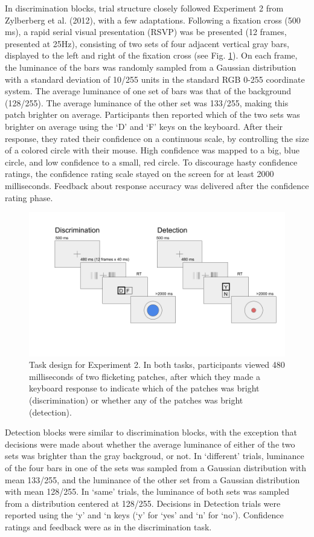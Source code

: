 \documentclass[12pt,twoside]{reedthesis}
\begin{document}
In discrimination blocks, trial structure closely followed Experiment 2 from Zylberberg et al. (2012), with a few adaptations. Following a fixation cross (500 ms), a rapid serial visual presentation (RSVP) was be presented (12 frames, presented at 25Hz), consisting of two sets of four adjacent vertical gray bars, displayed to the left and right of the fixation cross (see Fig. \ref{fig:ch2-exp2-design}). On each frame, the luminance of the bars was randomly sampled from a Gaussian distribution with a standard deviation of 10/255 units in the standard RGB 0-255 coordinate system. The average luminance of one set of bars was that of the background (128/255). The average luminance of the other set was 133/255, making this patch brighter on average. Participants then reported which of the two sets was brighter on average using the `D' and `F' keys on the keyboard. After their response, they rated their confidence on a continuous scale, by controlling the size of a colored circle with their mouse. High confidence was mapped to a big, blue circle, and low confidence to a small, red circle. To discourage hasty confidence ratings, the confidence rating scale stayed on the screen for at least 2000 milliseconds. Feedback about response accuracy was delivered after the confidence rating phase.
\begin{figure}
\includegraphics[width=\textwidth]{figure/ch2/designExp2} \caption[Experimental design for Exp. 2]{Task design for Experiment 2. In both tasks, participants viewed 480 milliseconds of two flicketing patches, after which they made a keyboard response to indicate which of the patches was bright (discrimination) or whether any of the patches was bright (detection). }\label{fig:ch2-exp2-design}
\end{figure}
Detection blocks were similar to discrimination blocks, with the exception that decisions were made about whether the average luminance of either of the two sets was brighter than the gray backgroud, or not. In `different' trials, luminance of the four bars in one of the sets was sampled from a Gaussian distribution with mean 133/255, and the luminance of the other set from a Gaussian distribution with mean 128/255. In `same' trials, the luminance of both sets was sampled from a distribution centered at 128/255. Decisions in Detection trials were reported using the `y' and `n keys (`y' for `yes' and `n' for `no'). Confidence ratings and feedback were as in the discrimination task.
\end{document}
